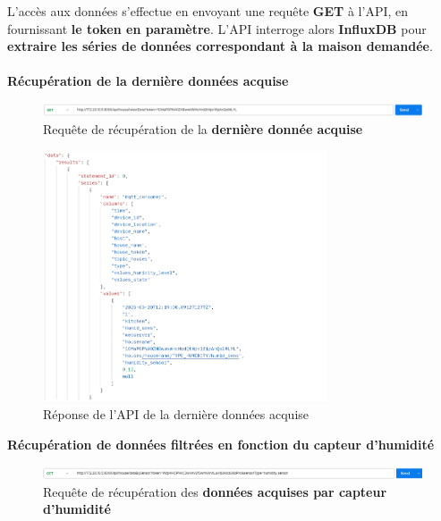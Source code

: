 \documentclass[10pt, a4paper]{report}
\begin{document}
	L’accès aux données s’effectue en envoyant une requête \textbf{GET} à l’API, en fournissant \textbf{le token en paramètre}. L’API interroge alors \textbf{InfluxDB} pour \textbf{extraire les séries de données correspondant à la maison demandée}.\\\\
	
	\textbf{Récupération de la dernière données acquise}
	\begin{figure}[h!]
		\centering
		\includegraphics[width=1\textwidth]{ressources/img/preuves/lastDataRequete}
		\caption{Requête de récupération de la \textbf{dernière donnée acquise}}
		\label{fig:lastDataRequete}
	\end{figure}
	\newpage
	\begin{figure}[h!]
		\centering
		\includegraphics[width=0.75\textwidth]{ressources/img/preuves/lastDataReponse}
		\caption{Réponse de l'API de la dernière données acquise}
		\label{fig:lastDataReponse}
	\end{figure}
	\vspace{1cm}
	\textbf{Récupération de données filtrées en fonction du capteur d'humidité}
	\begin{figure}[h!]
		\centering
		\includegraphics[width=1\textwidth]{ressources/img/preuves/dataBySensorRequete}
		\caption{Requête de récupération des \textbf{données acquises par capteur d'humidité}}
		\label{fig:dataBySensorRequete}
	\end{figure}
	\newpage
\end{document}
